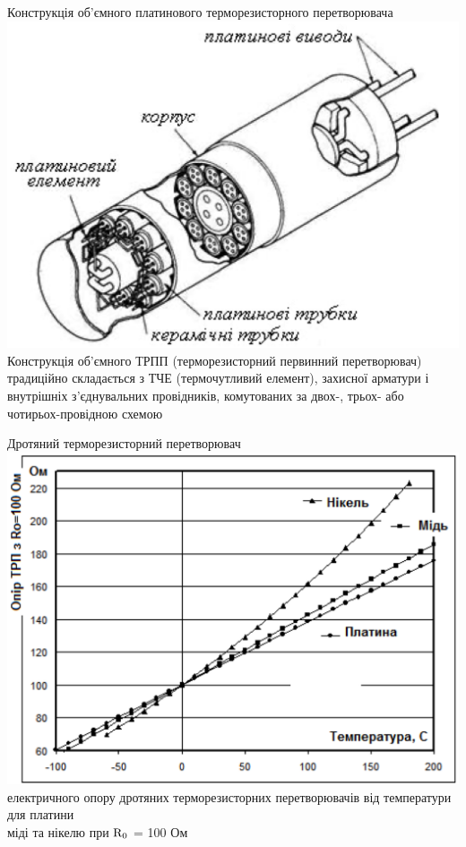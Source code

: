 \documentclass{beamer}
\begin{document}
 
\begin{frame}{Конструкція об’ємного платинового терморезисторного перетворювача}
\center \includegraphics[scale=0.23]{trpp.png}\\
\tiny Конструкція об’ємного ТРПП (терморезисторний первинний перетворювач) традиційно складається з ТЧЕ (термочутливий елемент), захисної арматури і внутрішніх з’єднувальних провідників, комутованих за двох-, трьох- або чотирьох-провідною схемою
\end{frame}




\begin{frame}{Дротяний терморезисторний перетворювач}
\center \includegraphics[scale=0.23]{trpp1.png}\\
  електричного опору дротяних терморезисторних перетворювачів від температури для платини\\ міді та нікелю при
  ${\rm R_{0}}$ = 100 Ом
 \end{frame}
\end{document}
